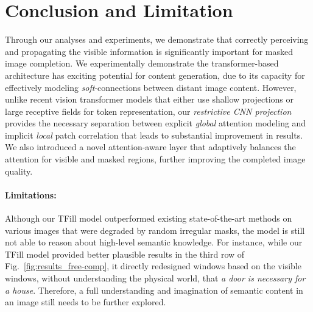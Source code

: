 \documentclass[10pt,twocolumn,letterpaper]{article}
\begin{document}
\section{Conclusion and Limitation}

Through our analyses and experiments, we demonstrate that correctly perceiving and propagating the visible information is significantly important for masked image completion. We experimentally demonstrate the transformer-based architecture has exciting potential for content generation, due to its capacity for effectively modeling \emph{soft}-connections between distant image content. However, unlike recent vision transformer models that either use shallow projections or large receptive fields for token representation, our \emph{restrictive CNN projection} provides the necessary separation between explicit \emph{global} attention modeling and implicit \emph{local} patch correlation that leads to substantial improvement in results. We also introduced a novel attention-aware layer that adaptively balances the attention for visible and masked regions, further improving the completed image quality.

\vspace{-0.2cm}\paragraph{Limitations:} Although our TFill model outperformed existing state-of-the-art methods on various images that were degraded by random irregular masks, the model is still not able to reason about high-level semantic knowledge. For instance, while our TFill model provided better plausible results in the third row of Fig.\ \ref{fig:results_free-comp}, it directly redesigned windows based on the visible windows, without understanding the physical world, that \emph{a door is necessary for a house}. Therefore, a full understanding and imagination of semantic content in an image still needs to be further explored.

{\small


}

\appendix\onecolumn
\renewcommand{\theequation}{\thesection.\arabic{equation}}
\setcounter{equation}{0}
\renewcommand{\thefigure}{\thesection.\arabic{figure}}
\setcounter{figure}{0}
\renewcommand{\thetable}{\thesection.\arabic{table}}
\setcounter{table}{0}
\newpage
\end{document}
